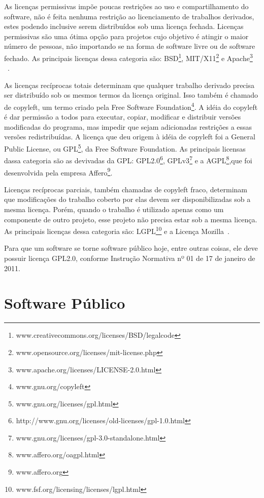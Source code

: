 As licenças permissivas impõe poucas restrições ao uso e compartilhamento do
software, não é feita nenhuma restrição ao licenciamento de trabalhos derivados, 
estes podendo inclusive serem distribuídos sob uma licença fechada. Licenças permissivas são 
uma ótima opção para projetos cujo objetivo é atingir o maior número de pessoas, 
não importando se na forma de software livre ou de software fechado. As principais 
licenças dessa categoria são: BSD\footnote{www.creativecommons.org/licenses/BSD/legalcode},
MIT/X11\footnote{www.opensource.org/licenses/mit-license.php} e Apache\footnote{www.apache.org/licenses/LICENSE-2.0.html}
~\cite{sabino2009licenccas}.

As licenças recíprocas totais determinam que qualquer trabalho derivado precisa 
ser distribuído sob os mesmos termos da licença original. Isso também é chamado de copyleft,
um termo criado pela Free Software Foundation\footnote{www.gnu.org/copyleft}. A idéia do
copyleft é dar permissão a todos para executar, copiar, modificar e distribuir versões
modificadas do programa, mas impedir que sejam adicionadas restrições a essas versões
redistribuídas. A licença que deu origem à idéia de copyleft foi a General Public 
License, ou GPL\footnote{www.gnu.org/licenses/gpl.html}, da Free Software Foundation.
As principais licensas dassa categoria são as devivadas da GPL: 
GPL2.0\footnote{http://www.gnu.org/licenses/old-licenses/gpl-1.0.html}, 
GPLv3\footnote{www.gnu.org/licenses/gpl-3.0-standalone.html} e a
AGPL\footnote{www.affero.org/oagpl.html},que foi desenvolvida pela empresa 
Affero\footnote{www.affero.org}.~\cite{sabino2009licenccas}

Licenças recíprocas parciais, também chamadas de copyleft fraco, determinam que
modificações do trabalho coberto por elas devem ser disponibilizadas sob a mesma 
licença. Porém, quando o trabalho é utilizado apenas como um componente de outro 
projeto, esse projeto não precisa estar sob a mesma licença. As principais licenças
dessa categoria são: LGPL\footnote{www.fsf.org/licensing/licenses/lgpl.html} e a
Licença Mozilla~\cite{sabino2009licenccas}.

Para que um software se torne software público hoje, entre outras coisas, ele deve
possuir licença GPL2.0, conforme Instrução Normativa nº 01 de 17 de janeiro de 2011.

\section{Software Público}

